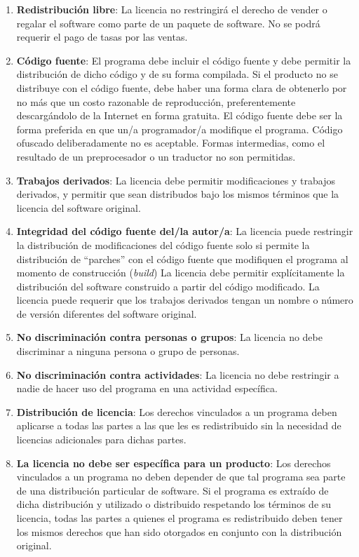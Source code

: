 \begin{enumerate}
\item {\bf Redistribución libre}: La licencia no restringirá el derecho de vender o regalar el software como parte de un paquete de software. No se podrá requerir el pago de tasas por las ventas.

\item {\bf Código fuente}: El programa debe incluir el código fuente y debe permitir la distribución de dicho código y de su forma compilada. Si el producto no se distribuye con el código fuente, debe haber una forma clara de obtenerlo por no más que un costo razonable de reproducción, preferentemente descargándolo de la Internet en forma gratuita. El código fuente debe ser la forma preferida en que un/a programador/a modifique el programa. Código ofuscado deliberadamente no es aceptable. Formas intermedias, como el resultado de un preprocesador o un traductor no son permitidas.

\item {\bf Trabajos derivados}: La licencia debe permitir modificaciones y trabajos derivados, y permitir que sean distribudos bajo los mismos términos que la licencia del software original.

\item {\bf Integridad del código fuente del/la autor/a}: La licencia puede restringir la distribución de modificaciones del código fuente solo si permite la distribución de ``parches'' con el código fuente que modifiquen el programa al momento de construcción (\emph{build}) La licencia debe permitir explícitamente la distribución del software construido a partir del código modificado. La licencia puede requerir que los trabajos derivados tengan un nombre o número de versión diferentes del software original.

\item {\bf No discriminación contra personas o grupos}: La licencia no debe discriminar a ninguna persona o grupo de personas.

\item {\bf No discriminación contra actividades}: La licencia no debe restringir a nadie de hacer uso del programa en una actividad específica. 

\item {\bf Distribución de licencia}: Los derechos vinculados a un programa deben aplicarse a todas las partes a las que les es redistribuido sin la necesidad de licencias adicionales para dichas partes.

\item {\bf La licencia no debe ser específica para un producto}: Los derechos vinculados a un programa no deben depender de que tal programa sea parte de una distribución particular de software. Si el programa es extraído de dicha distribución y utilizado o distribuido respetando los términos de su licencia, todas las partes a quienes el programa es redistribuido deben tener los mismos derechos que han sido otorgados en conjunto con la distribución original.


\end{enumerate}
